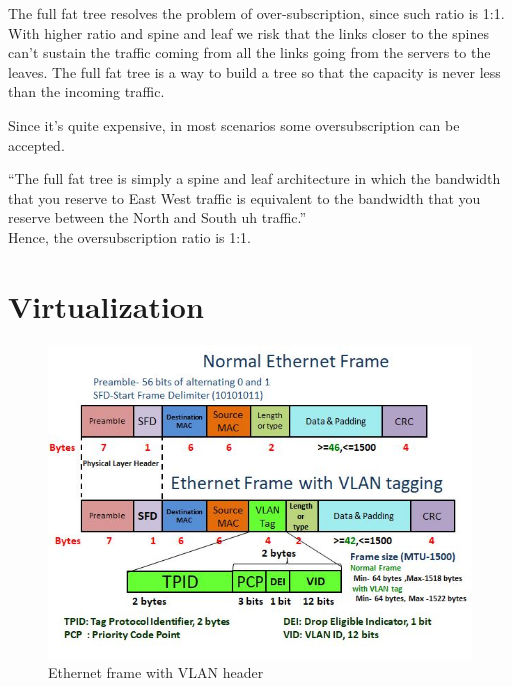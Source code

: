 The full fat tree resolves the problem of over-subscription, since such ratio is 1:1. 
With higher ratio and spine and leaf we risk that the links closer to the spines can’t sustain the traffic coming from all the links going from the servers to the leaves. 
The full fat tree is a way to build a tree so that the capacity is never
less than the incoming traffic.

Since it's quite expensive, in most scenarios some oversubscription can be accepted.

\begin{definition}
   ``The full fat tree is simply a spine and leaf architecture in which the bandwidth that you reserve to East West traffic is equivalent to the bandwidth that you reserve between the North and South uh traffic.''\\
   Hence, the oversubscription ratio is 1:1.
\end{definition}

\section{Virtualization}


\begin{figure}[htbp]
   \centering
   \includegraphics{images/vlan_header.jpg}
   \caption{Ethernet frame with VLAN header}
   \label{fig:vlan_header}
\end{figure}


